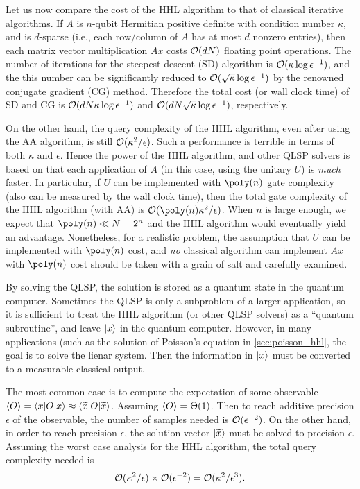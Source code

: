 \begin{rem}
Let us now compare the cost of the HHL algorithm to that of classical iterative
algorithms.
If $A$ is $n$-qubit Hermitian positive definite with condition number $\kappa$, and is $d$-sparse (i.e., each row/column of $A$ has at most $d$ nonzero entries), then each matrix vector multiplication $Ax$ costs $\mathcal{O}(dN)$ floating point operations. The number of iterations for the steepest descent (SD) algorithm is $\mathcal{O}(\kappa\log \epsilon^{-1})$, and the this number can be significantly reduced to $\mathcal{O}(\sqrt{\kappa}\log \epsilon^{-1})$ by the renowned conjugate gradient (CG) method.
Therefore the total cost (or wall clock time) of SD and CG is $\mathcal{O}(dN\kappa\log \epsilon^{-1})$
and $\mathcal{O}(dN\sqrt{\kappa}\log \epsilon^{-1})$, respectively.


On the other hand, the query complexity of the HHL algorithm, even after using the AA algorithm, is still $\mathcal{O}(\kappa^2/\epsilon)$.
Such a performance is terrible in terms of both $\kappa$ and $\epsilon$.
Hence the power of the HHL algorithm, and other QLSP solvers is based on that each application of $A$ (in this case, using the unitary $U$) is \emph{much} faster.
In particular, if $U$ can be implemented with $\poly(n)$ gate complexity (also can be measured by the wall clock time), then the total gate complexity of the HHL algorithm (with AA) is $\Or(\poly(n)\kappa^2/\epsilon)$.
When $n$ is large enough, we expect that $\poly(n)\ll N=2^n$ and the HHL algorithm would eventually yield an advantage.
Nonetheless, for a realistic problem, the assumption that $U$ can be implemented with $\poly(n)$ cost, and \emph{no} classical algorithm can implement $Ax$ with $\poly(n)$ cost should be taken with a grain of salt and carefully examined.
\end{rem}

\begin{rem}
\label{rem:readout_hhl}
By solving the QLSP, the solution is stored as a quantum state in the quantum computer.
Sometimes the QLSP is only a subproblem of a larger application, so it is sufficient to treat the HHL algorithm (or other QLSP solvers) as a ``quantum subroutine'', and leave $\ket{x}$ in the quantum computer.
However, in many applications (such as the solution of Poisson's equation in \cref{sec:poisson_hhl}, the goal is to solve the lienar system.
Then the information in $\ket{x}$ must be converted to a measurable classical output.

The most common case is to compute the expectation of some observable $\braket{O}=\braket{x|O|x}\approx \braket{\widetilde{x}|O|\widetilde{x}}$.
Assuming $\braket{O}=\Theta(1)$. Then to reach additive precision $\epsilon$ of the observable, the number of samples needed is $\mathcal{O}(\epsilon^{-2})$.
On the other hand, in order to reach precision $\epsilon$, the solution vector $\ket{\widetilde{x}}$ must be solved to precision $\epsilon$.
Assuming the worst case analysis for the HHL algorithm, the total query complexity needed is 
\begin{equation}
\mathcal{O}(\kappa^2/\epsilon)\times \mathcal{O}(\epsilon^{-2})=\mathcal{O}(\kappa^2/\epsilon^3).
\end{equation}
\end{rem}

